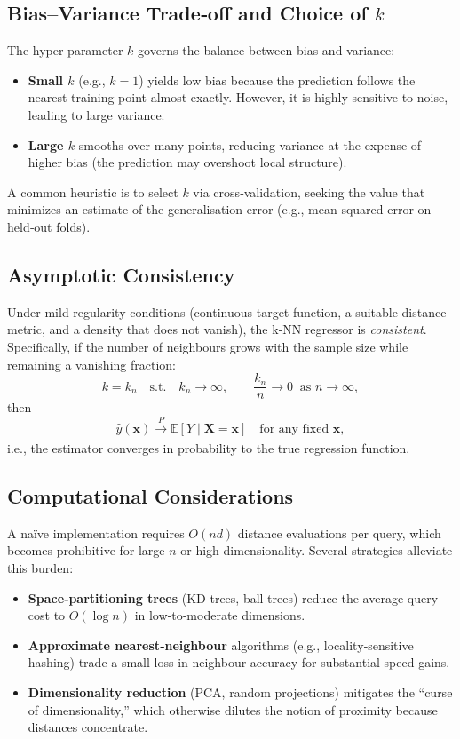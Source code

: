 \documentclass[12pt, a4paper]{article}
\begin{document}
\subsection{Bias–Variance Trade‑off and Choice of \(k\)}
The hyper‑parameter \(k\) governs the balance between bias and variance:
\begin{itemize}
  \item \textbf{Small \(k\)} (e.g., \(k=1\)) yields low bias because the prediction follows the nearest training point almost exactly.  However, it is highly sensitive to noise, leading to large variance.
  \item \textbf{Large \(k\)} smooths over many points, reducing variance at the expense of higher bias (the prediction may overshoot local structure).
\end{itemize}
A common heuristic is to select \(k\) via cross‑validation, seeking the value that minimizes an estimate of the generalisation error (e.g., mean‑squared error on held‑out folds).

\subsection{Asymptotic Consistency}
Under mild regularity conditions (continuous target function, a suitable distance metric, and a density that does not vanish), the k‑NN regressor is \emph{consistent}.  Specifically, if the number of neighbours grows with the sample size while remaining a vanishing fraction:
\[
k = k_n \quad\text{s.t.}\quad k_n \to \infty,\qquad \frac{k_n}{n}\to 0 \;\;\text{as } n\to\infty,
\]
then
\[
\hat y(\mathbf{x}) \xrightarrow[]{\;P\;} \mathbb{E}[Y\mid\mathbf{X}=\mathbf{x}]
\quad\text{for any fixed }\mathbf{x},
\]
i.e., the estimator converges in probability to the true regression function.

\subsection{Computational Considerations}
A naïve implementation requires \(O(nd)\) distance evaluations per query, which becomes prohibitive for large \(n\) or high dimensionality.  Several strategies alleviate this burden:
\begin{itemize}
  \item \textbf{Space‑partitioning trees} (KD‑trees, ball trees) reduce the average query cost to \(O(\log n)\) in low‑to‑moderate dimensions.
  \item \textbf{Approximate nearest‑neighbour} algorithms (e.g., locality‑sensitive hashing) trade a small loss in neighbour accuracy for substantial speed gains.
  \item \textbf{Dimensionality reduction} (PCA, random projections) mitigates the “curse of dimensionality,” which otherwise dilutes the notion of proximity because distances concentrate.
\end{itemize}
\end{document}
